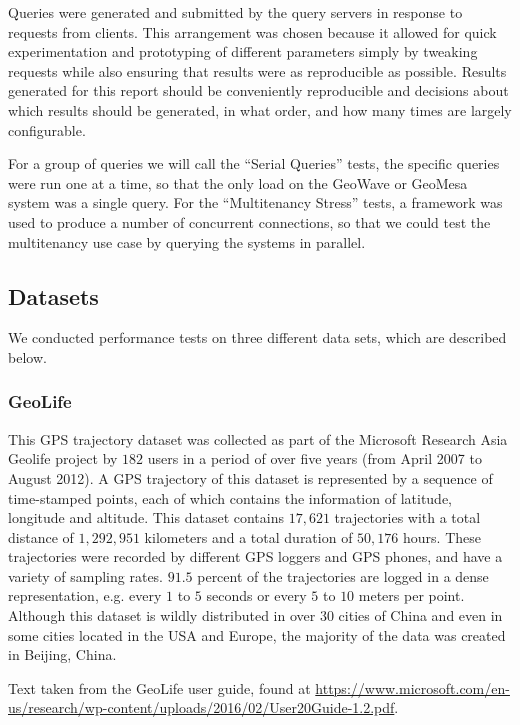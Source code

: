 Queries were generated and submitted by the query servers in response to requests from clients.
This arrangement was chosen because it allowed for quick experimentation and prototyping of different parameters simply by tweaking requests while also ensuring that results were as reproducible as possible. Results generated for this report should be conveniently reproducible and decisions about which results should be generated, in what order, and how many times are largely configurable.

For a group of queries we will call the ``Serial Queries'' tests, the specific queries were run one at a time, so that the only load on the GeoWave or GeoMesa system was a single query.
For the ``Multitenancy Stress'' tests, a framework was used to produce a number of concurrent connections, so that we could test the multitenancy use case by querying the systems in parallel.


\subsection{Datasets}
\label{sec:performance:datasets}

We conducted performance tests on three different data sets, which are described below.

\subsubsection{GeoLife}
\label{sec:performance:datasets:geolife}

This GPS trajectory dataset was collected as part of the Microsoft Research Asia Geolife project by $182$ users in a period of over five years (from April 2007 to August 2012).
A GPS trajectory of this dataset is represented by a sequence of time-stamped points, each of which contains the information of latitude, longitude and altitude.
This dataset contains $17,621$ trajectories with a total distance of $1,292,951$ kilometers and a total duration of $50,176$ hours.
These trajectories were recorded by different GPS loggers and GPS phones, and have a variety of sampling rates.
$91.5$ percent of the trajectories are logged in a dense representation, e.g. every $1$ to $5$ seconds or every $5$ to $10$ meters per point.
Although this dataset is wildly distributed in over $30$ cities of China and even in some cities located in the USA and Europe, the majority of the data was created in Beijing, China.

Text taken from the GeoLife user guide, found at \url{https://www.microsoft.com/en-us/research/wp-content/uploads/2016/02/User20Guide-1.2.pdf}.


